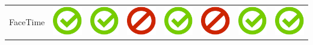 \documentclass[10pt,foldmark,tumble]{leaflet}
\begin{document}
\begin{center}
{{\begin{tabular}{ L{2cm} | C{2cm} | C{2cm} | C{2cm} | C{2cm} | C{2cm} | C{2cm} | C{2cm} }
FaceTime & \includegraphics[scale=0.1]{pics/haken.png} & \includegraphics[scale=0.1]{pics/haken.png} & \includegraphics[scale=0.1]{pics/nohaken.png} & \includegraphics[scale=0.1]{pics/haken.png} & \includegraphics[scale=0.1]{pics/nohaken.png} & \includegraphics[scale=0.1]{pics/haken.png} & \includegraphics[scale=0.1]{pics/haken.png} \tabularnewline

\end{tabular}}}
\end{center}
\end{document}
